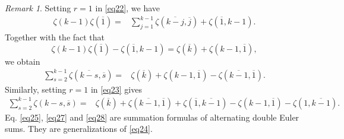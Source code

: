 \documentclass[reqno]{amsart}
\theoremstyle{definition}
\theoremstyle{remark}
\newtheorem{remark}[theorem]{Remark}
\numberwithin{equation}{section}
\begin{document}
\begin{remark}
Setting $r=1$ in \eqref{eq22}, we have
\begin{align*}
\zeta(k-1)\zeta(\overline{1})=&\sum_{j=1}^{k-1}   \zeta(\overline{k-j}, \overline{j})+\zeta(\overline{1}, k-1).
\end{align*}
Together with the fact that
$$\zeta(k-1)\zeta(\overline{1})-\zeta(\overline{1}, k-1)=\zeta(\overline{k})+\zeta(k-1, \overline{1}),$$ we obtain
\begin{align}\label{eq27}
\sum_{s=2}^{k-1}   \zeta(\overline{k-s}, \overline{s})=&\zeta(\overline{k})+\zeta(k-1,\overline{1})-\zeta(\overline{k-1}, \overline{1}).
\end{align}
Similarly, setting $r=1$ in \eqref{eq23} gives
\begin{align}\label{eq28}
\sum_{s=2}^{k-1}   \zeta(k-s, \overline{s})=&\zeta(\overline{k})+ \zeta(\overline{k-1}, \overline{1})+\zeta(\overline{1}, \overline{k-1})-\zeta(k-1, \overline{1})-\zeta(1, \overline{k-1}).
\end{align}
Eq. \eqref{eq25}, \eqref{eq27} and \eqref{eq28} are summation formulas of alternating double Euler sums. They are generalizations of \eqref{eq24}.
\end{remark}
\end{document}
